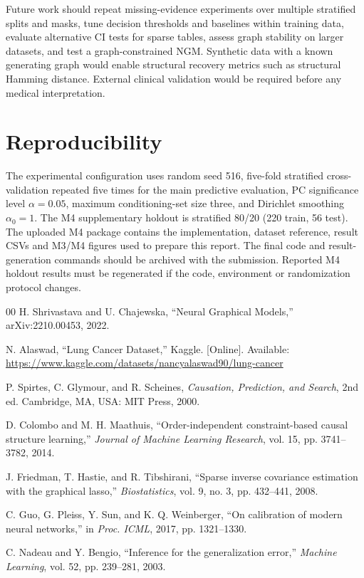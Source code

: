 \documentclass[conference]{IEEEtran}
\begin{document}
Future work should repeat missing-evidence experiments over multiple stratified splits and masks, tune decision thresholds and baselines within training data, evaluate alternative CI tests for sparse tables, assess graph stability on larger datasets, and test a graph-constrained NGM. Synthetic data with a known generating graph would enable structural recovery metrics such as structural Hamming distance. External clinical validation would be required before any medical interpretation.

\section*{Reproducibility}
The experimental configuration uses random seed 516, five-fold stratified cross-validation repeated five times for the main predictive evaluation, PC significance level $\alpha=0.05$, maximum conditioning-set size three, and Dirichlet smoothing $\alpha_0=1$. The M4 supplementary holdout is stratified 80/20 (220 train, 56 test). The uploaded M4 package contains the implementation, dataset reference, result CSVs and M3/M4 figures used to prepare this report. The final code and result-generation commands should be archived with the submission. Reported M4 holdout results must be regenerated if the code, environment or randomization protocol changes.


\begin{thebibliography}{00}
H. Shrivastava and U. Chajewska, ``Neural Graphical Models,'' arXiv:2210.00453, 2022.

N. Alaswad, ``Lung Cancer Dataset,'' Kaggle. [Online]. Available: \url{https://www.kaggle.com/datasets/nancyalaswad90/lung-cancer}

P. Spirtes, C. Glymour, and R. Scheines, \emph{Causation, Prediction, and Search}, 2nd ed. Cambridge, MA, USA: MIT Press, 2000.

D. Colombo and M. H. Maathuis, ``Order-independent constraint-based causal structure learning,'' \emph{Journal of Machine Learning Research}, vol. 15, pp. 3741--3782, 2014.

J. Friedman, T. Hastie, and R. Tibshirani, ``Sparse inverse covariance estimation with the graphical lasso,'' \emph{Biostatistics}, vol. 9, no. 3, pp. 432--441, 2008.

C. Guo, G. Pleiss, Y. Sun, and K. Q. Weinberger, ``On calibration of modern neural networks,'' in \emph{Proc. ICML}, 2017, pp. 1321--1330.

C. Nadeau and Y. Bengio, ``Inference for the generalization error,'' \emph{Machine Learning}, vol. 52, pp. 239--281, 2003.
\end{thebibliography}
\end{document}

